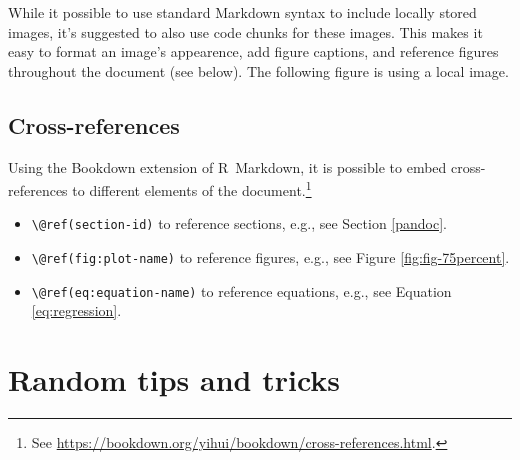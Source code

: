\documentclass{article}
\begin{document}
\medskip\noindent While it possible to use standard Markdown syntax to include locally stored images, it's suggested to also use code chunks for these images. This makes it easy to format an image's appearence, add figure captions, and reference figures throughout the document (see below). The following figure is using a local image.

\hypertarget{cross-references}{%
\subsection{Cross-references}\label{cross-references}}

Using the Bookdown extension of \textsf{R}~Markdown, it is possible to embed cross-references to different elements of the document.\footnote{See \url{https://bookdown.org/yihui/bookdown/cross-references.html}.}

\begin{itemize}
\tightlist
\item
  \texttt{\textbackslash{}@ref(section-id)} to reference sections, e.g., see Section \ref{pandoc}.
\item
  \texttt{\textbackslash{}@ref(fig:plot-name)} to reference figures, e.g., see Figure \ref{fig:fig-75percent}.
\item
  \texttt{\textbackslash{}@ref(eq:equation-name)} to reference equations, e.g., see Equation \eqref{eq:regression}.
\end{itemize}

\hypertarget{random-tips-and-tricks}{%
\section{Random tips and tricks}\label{random-tips-and-tricks}}
\end{document}
